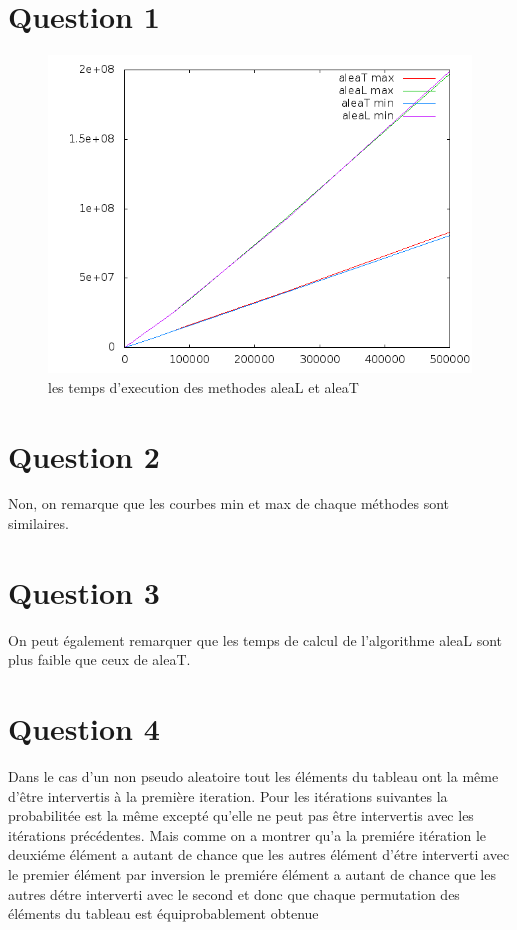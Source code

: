 \documentclass[a4paper,12pt]{report}
\begin{document}
\section*{{\Huge{}}}

\section*{Question 1}
\begin{figure}[!ht]
	\center
	\includegraphics[scale=0.5]{q1.png}
	\caption{les temps d’execution des methodes aleaL et aleaT}
\end{figure}

\section*{Question 2}
Non, on remarque que les courbes min et max de chaque méthodes sont similaires.

\section*{Question 3}
On peut également remarquer que les temps de calcul de l'algorithme aleaL sont plus faible que ceux de aleaT.

\section*{Question 4}
Dans le cas d'un non pseudo aleatoire tout les éléments du tableau ont la même d'être intervertis à la première iteration. Pour les itérations suivantes la probabilitée est la même excepté qu'elle ne peut pas être intervertis avec les itérations précédentes. Mais comme on a montrer qu'a la premiére itération le deuxiéme élément a autant de chance que les autres élément d'étre interverti avec le premier élément par inversion le premiére élément a autant de chance que les autres détre interverti avec le second et donc que chaque permutation des éléments du tableau est équiprobablement obtenue
\end{document}
